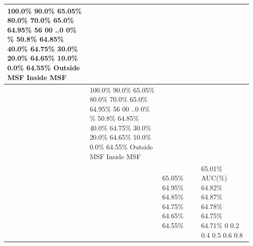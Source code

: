 \begin{tabular}{llll}
\toprule
100.0\% 90.0\% 65.05\% 80.0\% 70.0\% 65.0\% 64.95\% 56 00 ..0 0\% \% 50.8\% 64.85\% 40.0\% 64.75\% 30.0\% 20.0\% 64.65\% 10.0\% 0.0\% 64.55\% Outside MSF Inside MSF &  &  &  \\
\midrule
 & 100.0\% 90.0\% 65.05\% 80.0\% 70.0\% 65.0\% 64.95\% 56 00 ..0 0\% \% 50.8\% 64.85\% 40.0\% 64.75\% 30.0\% 20.0\% 64.65\% 10.0\% 0.0\% 64.55\% Outside MSF Inside MSF &  &  \\
 &  & 65.05\% 64.95\% 64.85\% 64.75\% 64.65\% 64.55\% & 65.01\% AUC(\%) 64.82\% 64.87\% 64.78\% 64.75\% 64.71\% 0 0.2 0.4 0.5 0.6 0.8 \\
\bottomrule
\end{tabular}
